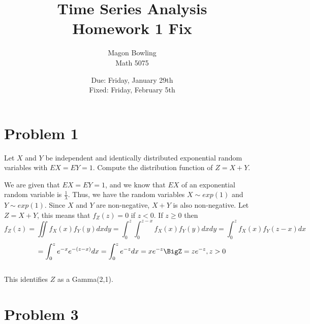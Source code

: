 \documentclass[11pt]{article}
\theoremstyle{definition}
\newcommand{\1}[1]{\mathbf{1} \left \{ #1 \right \}}
\begin{document}
\title{Time Series Analysis \\ Homework 1 \Rightarrow Fix}
\date{Due: Friday, January 29th \\ Fixed: Friday, February 5th}
\author{Magon Bowling \\ Math 5075}

\maketitle

\section{{\color{red} \textbf{Problem 1}}}

\item Let $X$ and $Y$ be independent and identically distributed exponential random variables with \(EX = EY = 1\).  Compute the distribution function of \(Z = X + Y \).
\\
\item We are given that \(EX = EY = 1\), and we know that $EX$ of an exponential random variable is \(\frac{1}{\lambda}\). Thus, we have the random variables \(X \sim exp(1)\) and \(Y \sim exp(1)\).  Since $X$ and $Y$ are non-negative, $X + Y$ is also non-negative.  Let $Z = X + Y$, this means that \(f_Z (z) = 0\) if $z<0$.  If $z \geq 0$ then
\[f_Z (z) = \iint f_X (x) f_Y (y) dx dy = \int_0^z \int_0^{z-x} f_X (x) f_Y (y) dx dy = \int_0^z f_X (x) f_Y (z-x) dx\]
\[= \int_0^z e^{-x} e^{-(z-x)} dx = \int_0^z e^{-z} dx = xe^{-z}\BigZ = ze^{-z}, z>0 \]
\\
This identifies $Z$ as a Gamma(2,1).

\section{{\color{red} \textbf{Problem 3}}}
\end{document}
